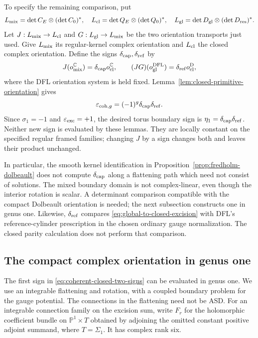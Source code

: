\documentclass[11pt]{amsart}
\theoremstyle{definition}
\theoremstyle{remark}
\theoremstyle{plain}
\newcommand{\CC}{\mathbb{C}}
\newcommand{\PP}{\mathbb{P}}
\begin{document}
To specify the remaining comparison, put
\[
 L_{\rm mix}=\det C_E\otimes(\det C_0)^*,\quad
 L_{\rm cl}=\det Q_E\otimes(\det Q_0)^*,\quad
 L_{\rm gl}=\det D_{\rm gl}\otimes(\det D_{\rm res})^*.
\]
Let $J:L_{\rm mix}\to L_{\rm cl}$ and
$G:L_{\rm gl}\to L_{\rm mix}$ be the two orientation
transports just used. Give $L_{\rm mix}$ its
regular-kernel complex orientation and $L_{\rm cl}$
the closed complex orientation. Define the signs
$\delta_{\rm cap},\delta_{\rm ref}$ by
\[
 J(o_{\rm mix}^{\CC})=\delta_{\rm cap}o_{\rm cl}^{\CC},
 \qquad
 (JG)(o_{\rm gl}^{\rm DFL})
                     =\delta_{\rm ref}o_{\rm cl}^{\rm D},
\]
where the DFL orientation system is held fixed.
Lemma~\ref{lem:closed-primitive-orientation} gives
\begin{equation}\label{eq:coherent-closed-two-signs}
 \varepsilon_{{\rm coh},g}
          =(-1)^g\delta_{\rm cap}\delta_{\rm ref}.
\end{equation}
Since $\sigma_1=-1$ and $\varepsilon_{\rm exc}=+1$,
the desired torus boundary sign is
$\eta_1=\delta_{\rm cap}\delta_{\rm ref}$.
Neither new sign is evaluated by these lemmas.
They are locally constant on the specified regular
framed families; changing $J$ by a sign changes both
and leaves their product unchanged.

In particular, the smooth kernel identification in
Proposition~\ref{prop:fredholm-dolbeault} does not
compute $\delta_{\rm cap}$ along a flattening path
which need not consist of solutions. The mixed
boundary domain is not complex-linear, even though
the interior rotation is scalar. A determinant
comparison compatible with the compact Dolbeault
orientation is needed; the next subsection constructs
one in genus one. Likewise,
$\delta_{\rm ref}$ compares
\eqref{eq:global-to-closed-excision} with DFL's
reference-cylinder prescription in the chosen
ordinary gauge normalization. The closed parity
calculation does not perform that comparison.

\subsection{The compact complex orientation in genus one}
\label{sec:torus-compact-complex-orientation}

The first sign in \eqref{eq:coherent-closed-two-signs}
can be evaluated in genus one. We use an integrable
flattening and rotation, with a coupled boundary problem
for the gauge potential. The connections in the
flattening need not be ASD.
For an integrable connection family on the excision
sum, write $F_r$ for the holomorphic coefficient
bundle on $\PP^1\times T$ obtained by adjoining
the omitted constant positive adjoint summand,
where $T=\Sigma_1$. It has complex rank six.
\end{document}
